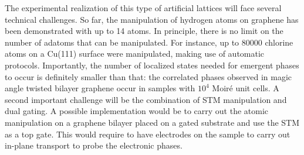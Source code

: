 The experimental realization of this type of artificial lattices will face several technical challenges. So far, the manipulation of hydrogen atoms on graphene has been demonstrated with up to 14 atoms\cite{Brihuega2016}. In principle, there is no limit on the number of adatoms that can be manipulated\cite{khajetoorians2019}. For instance, up to %
80000 chlorine atoms on a Cu(111) surface were manipulated, making use of automatic protocols\cite{Kalff2016}.
Importantly, the number of localized states needed for emergent phases to occur
 is definitely smaller than that: the correlated phases observed in magic angle twisted bilayer graphene occur in samples with $10^4$ Moiré unit cells.
% 
A second important challenge will be the combination of STM manipulation and dual gating. A possible implementation would be to carry out the atomic manipulation on a graphene bilayer placed on a gated substrate and use the STM as a top gate. This would require to have electrodes on the sample to carry out in-plane transport to probe the electronic phases. 

